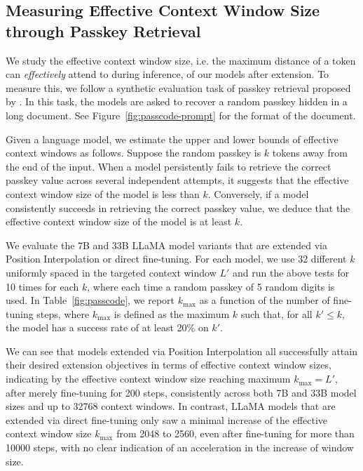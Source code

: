 \documentclass{article} %
\theoremstyle{definition}
\begin{document}
\subsection{Measuring Effective Context Window Size through Passkey Retrieval}
\label{sec:passkey}
We study the effective context window size, i.e. the maximum distance of a token can \emph{effectively} attend to during inference,  of our models after extension. 
To measure this, we follow a synthetic evaluation task of passkey retrieval proposed by \citet{mohtashami2023landmark}.
In this task, the models are asked to recover a random passkey hidden in a long document. 
See Figure~\ref{fig:passcode-prompt} for the format of the document.

Given a language model, we estimate the upper and lower bounds of effective context windows as follows.
Suppose the random passkey is $k$ tokens away from the end of the input. 
When a model persistently fails to retrieve the correct passkey value across several independent attempts, 
it suggests that the effective context window size of the model is less than $k$. 
Conversely, if a model consistently succeeds in retrieving the correct passkey value, 
we deduce that the effective context window size of the model is at least $k$. 

We evaluate the 7B and 33B LLaMA model variants that are extended via Position Interpolation or direct fine-tuning. 
For each model, we use 32 different $k$ uniformly spaced in the targeted context window $L'$ and run the above tests 
for 10 times for each $k$, where each time a random passkey of 5 random digits is used. 
In Table~\ref{fig:passcode}, we report $k_{\max}$ as a function of the number of fine-tuning steps, where $k_{\max}$ is defined as the maximum $k$ such that, for all  $k' \le k$, the model has a success rate of at least 20\% on $k'$.

We can see that models extended via Position Interpolation all successfully attain their desired extension objectives in terms of effective context window sizes, indicating by the effective context window size reaching maximum $k_{\max}=L'$, after merely fine-tuning for 200 steps, consistently across both 7B and 33B model sizes and up to 32768 context windows.
In contrast, LLaMA models that are extended via direct fine-tuning only saw a minimal increase of the effective context window size $k_{\max}$ from 2048 to 2560, even after
fine-tuning for more than 10000 steps, with no clear indication of an acceleration in the increase of window size. 
\end{document}
